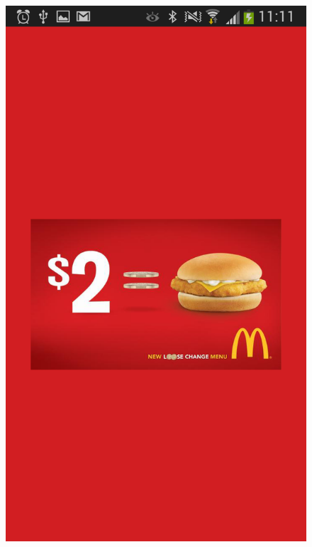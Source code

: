 \begin{figure}
\begin{center}
\includegraphics[scale=0.25]{Images/gesturead_big1.png}

\end{center}
\end{figure}
